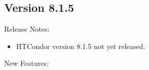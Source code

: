 \subsection*{\label{sec:New-8-1-5}Version 8.1.5}

\noindent Release Notes:

\begin{itemize}

\item HTCondor version 8.1.5 not yet released.

\end{itemize}


\noindent New Features:

